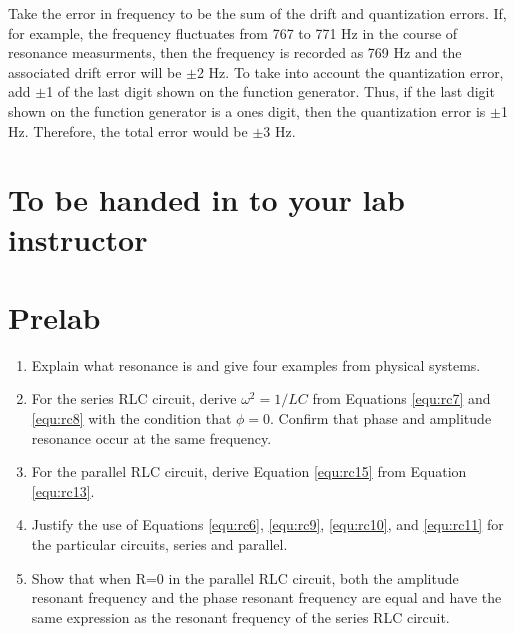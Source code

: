 Take the error in frequency to be the sum of the drift and quantization errors. If, for example, the frequency fluctuates from 767 to 771 Hz in the course of resonance measurments, then the frequency is recorded as 769 Hz and the associated drift error will be $\pm$2 Hz. To take into account the quantization error, add $\pm$1 of the last digit shown on the function generator. Thus, if the last digit shown on the function generator is a ones digit, then the quantization error is $\pm$1 Hz. Therefore, the total error would be $\pm$3 Hz.

\section{To be handed in to your lab instructor}

\section{Prelab}
\begin{enumerate}

\item Explain what resonance is and give four examples from physical systems.

\item For the series RLC circuit, derive $\omega^2 = 1/LC$ from Equations \ref{equ:rc7} and \ref{equ:rc8} with the condition that $\phi = 0$. Confirm that phase and amplitude resonance occur at the same frequency.

\item For the parallel RLC circuit, derive Equation \ref{equ:rc15} from Equation \ref{equ:rc13}.

\item Justify the use of Equations \ref{equ:rc6}, \ref{equ:rc9}, \ref{equ:rc10}, and \ref{equ:rc11} for the particular circuits, series and parallel.

\item Show that when R=0 in the parallel RLC circuit, both the amplitude resonant frequency and the phase resonant frequency are equal and have the same expression as the resonant frequency of the series RLC circuit.
\end{enumerate}

